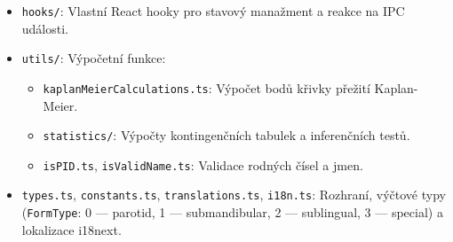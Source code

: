 \documentclass[12pt,a4paper]{article}
\begin{document}
\begin{itemize}
\begin{itemize}
        \begin{itemize}
            \item Příušní žláza (\texttt{parotid/})
            \item Podčelistní žláza (\texttt{submandibular/})
            \item Podjazyková žláza (\texttt{sublingual/})
        \end{itemize}
        \item Formulářové sekce:
        \begin{itemize}
            \item Osobní údaje: \texttt{personal-data.tsx}
            \item Histopatologie:
            \begin{itemize}
                \item \texttt{histopathology-malignant.tsx}
                \item \texttt{histopathology-benign.tsx}
            \end{itemize}
            \item TNM klasifikace:
            \begin{itemize}
                \item \texttt{tnm-classification.tsx}
                \item \texttt{tnm-classification-calculator.tsx}
            \end{itemize}
            \item Dispensarizace:
            \begin{itemize}
                \item \texttt{dispensarization-malignant.tsx}
                \item \texttt{dispensarization-benign.tsx}
            \end{itemize}
            \item Soubory a přílohy: \texttt{attachments.tsx}
        \end{itemize}
    \end{itemize}
    \item \texttt{hooks/}: Vlastní React hooky pro stavový manažment a reakce na IPC události.
    \item \texttt{utils/}: Výpočetní funkce:
    \begin{itemize}
        \item \texttt{kaplanMeierCalculations.ts}: Výpočet bodů křivky přežití Kaplan-Meier.
        \item \texttt{statistics/}: Výpočty kontingenčních tabulek a inferenčních testů.
        \item \texttt{isPID.ts}, \texttt{isValidName.ts}: Validace rodných čísel a jmen.
    \end{itemize}
    \item \texttt{types.ts}, \texttt{constants.ts}, \texttt{translations.ts}, \texttt{i18n.ts}: Rozhraní, výčtové typy (\texttt{FormType}: 0 --- parotid, 1 --- submandibular, 2 --- sublingual, 3 --- special) a lokalizace i18next.
\end{itemize}
\end{document}
